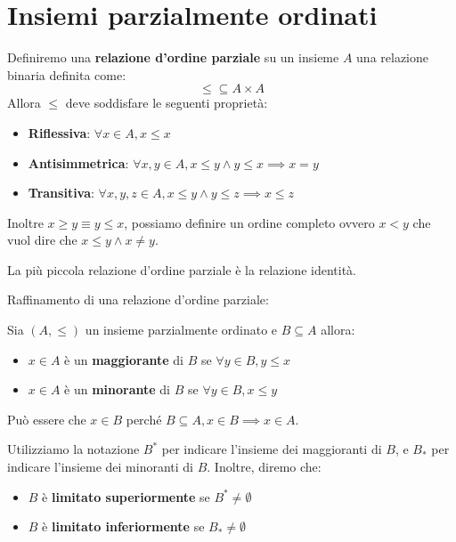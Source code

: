 \section{Insiemi parzialmente ordinati}
\begin{definizione}
    Definiremo una \textbf{relazione d'ordine parziale} su un insieme $A$ una
    relazione binaria definita come:
    \begin{equation}
        \leq \subseteq A \times A
    \end{equation}
    Allora $\leq$ deve soddisfare le seguenti proprietà:
    \begin{itemize}
        \item \textbf{Riflessiva}: $\forall x \in A, x \leq x$
        \item \textbf{Antisimmetrica}: $\forall x, y \in A, x \leq y \land y
                  \leq x \implies x = y$
        \item \textbf{Transitiva}: $\forall x, y, z \in A, x \leq y \land y \leq
                  z \implies x \leq z$
    \end{itemize}
\end{definizione}
Inoltre $x \geq y \equiv y \leq x$, possiamo definire un ordine completo ovvero
$x < y$ che vuol dire che $x \leq y \land x \neq y$.
\begin{osservazione}
    La più piccola relazione d'ordine parziale è la relazione identità.
\end{osservazione}
Raffinamento di una relazione d'ordine parziale:
\begin{definizione}
    Sia $(A,\leq)$ un insieme parzialmente ordinato e $B \subseteq A$ allora:
    \begin{itemize}
        \item $x \in A$ è un \textbf{maggiorante} di $B$ se $\forall y \in B, y
                  \leq x$
        \item $x \in A$ è un \textbf{minorante} di $B$ se $\forall y \in B, x
                  \leq y$
    \end{itemize}
    Può essere che $x \in B$ perché $B \subseteq A, x \in B \implies x \in A$.
\end{definizione}
Utilizziamo la notazione $B^\ast$ per indicare l'insieme dei maggioranti di $B$,
e $B_\ast$ per indicare l'insieme dei minoranti di $B$. Inoltre, diremo che:
\begin{itemize}
    \item $B$ è \textbf{limitato superiormente} se $B^\ast \neq \emptyset$
    \item $B$ è \textbf{limitato inferiormente} se $B_\ast \neq \emptyset$
\end{itemize}
